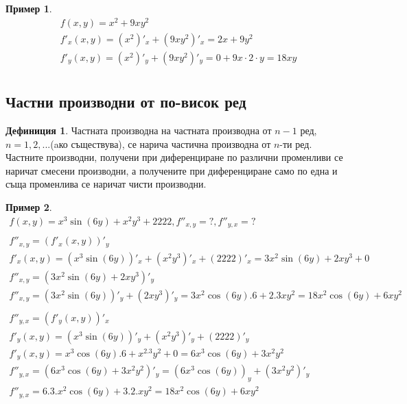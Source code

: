 \documentclass[a4paper,fleqn,12pt]{article}
\theoremstyle{definition}
\newtheorem{definition}{Дефиниция}[subsection]
\newtheorem{example}{Пример}[subsection]
\begin{document}
\begin{example}
\begin{gather*}
f(x,y) = x^2 + 9xy^2\\
f'_x (x,y) = (x^2)'_x+(9xy^2)'_x = 2x + 9y^2\\
f'_y (x,y) = (x^2)'_y+(9xy^2)'_y = 0 + 9x \cdot 2 \cdot y = 18xy \\
\end{gather*}
\end{example}

\subsection{Частни производни от по-висок ред}

\begin{definition}
Частната производна на частната производна от $n-1$ ред, $n = 1, 2, ...$(aко съществува), се нарича частична производна от $n$-ти ред. Частните производни, получени при диференциране по различни променливи се наричат смесени производни, а получените при диференциране само по една и съща променлива се наричат чисти производни. 
\end{definition}

\begin{example}
\begin{gather*}
f(x,y) = x^3\sin(6y) + x^2y^3 + 2222, f''_{x,y} = ?, f''_{y,x} = ? \\
\\
f''_{x,y} = (f'_x(x,y))'_y\\
f'_x(x,y) =(x^3\sin(6y))'_x + (x^2y^3)'_x + (2222)'_x = 3x^2 \sin(6y) + 2xy^3 + 0 \\
f''_{x,y} = (3x^2 \sin(6y) + 2xy^3)'_y \\
f''_{x,y} = (3x^2 \sin(6y))'_y + (2xy^3)'_y  =3x^2 \cos(6y).6 + 2.3xy^2 = 18x^2\cos(6y) + 6xy^2\\
\\
f''_{y,x} = (f'_y(x,y))'_x\\
f'_y (x,y) =(x^3\sin(6y))'_y + (x^2y^3)'_y + (2222)'_y \\
f'_y (x,y) = x^3 \cos(6y).6 + x^2.3y^2 + 0 = 6x^3 \cos(6y) + 3x^2y^2 \\
f''_{y,x} = (6x^3 \cos(6y) + 3x^2y^2)'_y = (6x^3 \cos(6y))_y + (3x^2y^2)'_y \\
f''_{y,x} = 6.3.x^2 \cos(6y) + 3.2.xy^2 = 18x^2\cos(6y) + 6xy^2 \\
\end{gather*}
\end{example}
\end{document}
